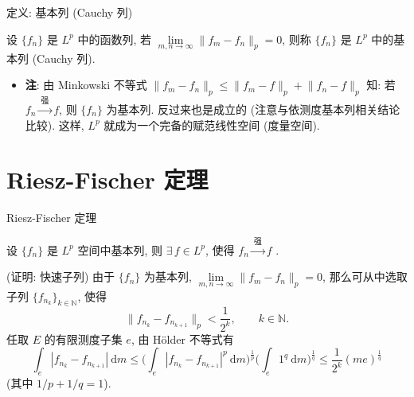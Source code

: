 \begin{frame}{定义: 基本列 (Cauchy 列)}

\begin{Def}[基本列]
设 $\{ f_n \}$ 是 $L^p$ 中的函数列, 若
$\lim\limits_{m, n \to \infty} \lVert f_m - f_n \rVert_p = 0$,
则称 $\{ f_n \}$ 是 $L^p$ 中的\alert{基本列} (Cauchy 列).
\end{Def}

\pause

\begin{itemize}
\item \textbf{注}: 由 Minkowski 不等式
  $\lVert f_m - f_n \rVert_p \leqslant \lVert f_m - f \rVert_p + \lVert f_n - f \rVert_p$
  知: 若 $f_n \xrightarrow{\ \text{强}\ } f$, 则 $\{ f_n \}$ 为基本列.
  反过来也是成立的 (注意与依测度基本列相关结论比较).
  这样, $L^p$ 就成为一个\alert{完备}的赋范线性空间 (度量空间).
\end{itemize}

\end{frame}


\section[完备性]{Riesz-Fischer 定理}


\begin{frame}{Riesz-Fischer 定理}

\begin{thm}
设 $\{ f_n \}$ 是 $L^p$ 空间中基本列, 则 $\exists\, f \in L^p$,
使得 $f_n \xrightarrow{\ \text{强}\ } f$ .
\end{thm}

\startproof[bg=yellow, fg=red](证明: 快速子列)
由于 $\{ f_n \}$ 为基本列, $\lim\limits_{m, n \to \infty} \lVert f_m - f_n \rVert_p = 0$,
那么可从中选取子列 $\{ f_{n_k} \}_{k \in \mathbb{N}}$, 使得
\[
\lVert f_{n_k} - f_{n_{k+1}} \rVert_p < \frac{1}{2^k}, \qquad k \in \mathbb{N} .
\]
任取 $E$ 的有限测度子集 $e$, 由 Hölder 不等式有
\[
\int_e |f_{n_k} - f_{n_{k+1}}| ~ \mathrm{d} m
\leqslant \Big( \int_e |f_{n_k} - f_{n_{k+1}}|^p ~ \mathrm{d} m \Big)^{\frac1p}
\Big( \int_e 1^q ~ \mathrm{d} m \Big)^{\frac1q}
\leqslant \frac{1}{2^k} \left( m e \right)^{\frac1q}
\]
(其中 $1/p + 1/q = 1$).

\end{frame}

